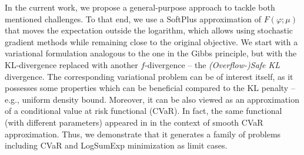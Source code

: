 \documentclass{article}
\theoremstyle{plain}
\theoremstyle{definition}
\theoremstyle{remark}
\begin{document}
In the current work, we propose a general-purpose approach to tackle both mentioned challenges. To that end, we use a SoftPlus approximation of $F(\varphi; \mu)$ that 
moves the expectation outside the logarithm, which 
allows using stochastic gradient methods while remaining close to the original objective. 
We start with a variational formulation analogous to the one in the Gibbs principle, but with the KL-divergence replaced with another $f$-divergence -- the \emph{(Overflow-)Safe KL} divergence. 
The corresponding variational problem can be of interest itself, as it possesses some properties which can be beneficial compared to the KL penalty -- e.g., uniform density bound. 
Moreover, it can be also viewed as an approximation of a conditional value at risk functional (CVaR).
In fact, the same functional (with different parameters) appeared in \cite{soma2020statistical} in the context of smooth CVaR approximation.
Thus, we demonstrate that it generates a family of problems including CVaR and LogSumExp minimization as limit cases.
\end{document}
